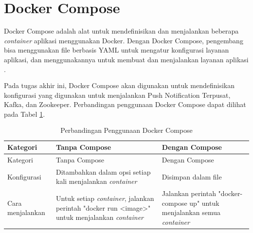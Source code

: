 \section{Docker Compose}
\par Docker Compose adalah alat untuk mendefinisikan dan menjalankan beberapa \textit{container} aplikasi menggunakan Docker. Dengan Docker Compose, pengembang bisa menggunakan file berbasis YAML untuk mengatur konfigurasi layanan aplikasi, dan menggunakannya untuk membuat dan menjalankan layanan aplikasi \cite{docker-compose-online}.
\par Pada tugas akhir ini, Docker Compose akan digunakan untuk mendefinisikan konfigurasi yang digunakan untuk menjalankan Push Notification Terpusat, Kafka, dan Zookeeper. Perbandingan penggunaan Docker Compose dapat dilihat pada Tabel \ref{t:perbandingan_docker_compose}.
\begin{longtable}{|p{2cm}|p{3.5cm}|p{3.5cm}|}
	\caption{Perbandingan Penggunaan Docker Compose} \label{t:perbandingan_docker_compose} \\ \hline
	\rowcolor{lightgray} Kategori & Tanpa Compose & Dengan Compose \\ \hline
	\endfirsthead
	\hline
	\rowcolor{lightgray} Kategori & Tanpa Compose & Dengan Compose \\ \hline
	\endhead
	Konfigurasi & Ditambahkan dalam opsi setiap kali menjalankan \textit{container} & Disimpan dalam file \\ \hline
	Cara menjalankan & Untuk setiap \textit{container}, jalankan perintah "docker run <image>" untuk menjalankan \textit{container} & Jalankan perintah "docker-compose up" untuk menjalankan semua \textit{container} \\ \hline
\end{longtable}

